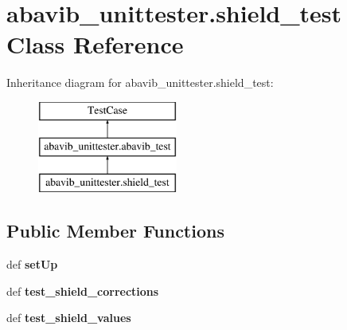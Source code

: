 \hypertarget{classabavib__unittester_1_1shield__test}{\section{abavib\+\_\+unittester.\+shield\+\_\+test Class Reference}
\label{classabavib__unittester_1_1shield__test}
}
Inheritance diagram for abavib\+\_\+unittester.\+shield\+\_\+test\+:\begin{figure}[H]
\begin{center}
\leavevmode
\includegraphics[height=3.000000cm]{classabavib__unittester_1_1shield__test}
\end{center}
\end{figure}
\subsection*{Public Member Functions}
\begin{DoxyCompactItemize}
\item 
\hypertarget{classabavib__unittester_1_1shield__test_a0be7b73cb7edd0d2ce164be2567f302a}{def {\bfseries set\+Up}}\label{classabavib__unittester_1_1shield__test_a0be7b73cb7edd0d2ce164be2567f302a}

\item 
\hypertarget{classabavib__unittester_1_1shield__test_ab330ebe268b30e1da3c1a19dd3eaca17}{def {\bfseries test\+\_\+shield\+\_\+corrections}}\label{classabavib__unittester_1_1shield__test_ab330ebe268b30e1da3c1a19dd3eaca17}

\item 
\hypertarget{classabavib__unittester_1_1shield__test_a782de883f3e5356f1fe465544046a5b1}{def {\bfseries test\+\_\+shield\+\_\+values}}\label{classabavib__unittester_1_1shield__test_a782de883f3e5356f1fe465544046a5b1}

\end{DoxyCompactItemize}
